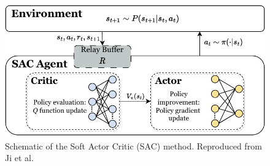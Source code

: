 \begin{figure}[htb]
    \centering
    \includegraphics[width=0.75\linewidth]{img/chap4/SAC.pdf}
    \caption{Schematic of the Soft Actor Critic (SAC) method. Reproduced from Ji et al.\cite{jiSynthesizingOptimalGait2022}}
    \label{fig:SAC}
\end{figure}
